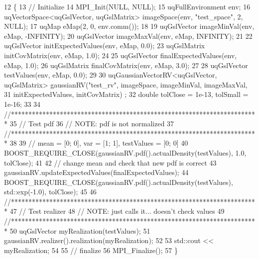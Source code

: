 \begin{DoxyCode}
12 \{
13   \textcolor{comment}{// Initialize}
14   MPI\_Init(NULL, NULL);
15   uqFullEnvironment env;
16   uqVectorSpace<uqGslVector, uqGslMatrix> imageSpace(env, \textcolor{stringliteral}{"test\_space"}, 2, NULL);
17   uqMap eMap(2, 0, env.comm());
18 
19   uqGslVector imageMinVal(env, eMap, -INFINITY);
20   uqGslVector imageMaxVal(env, eMap,  INFINITY);
21 
22   uqGslVector initExpectedValues(env, eMap, 0.0);
23   uqGslMatrix initCovMatrix(env, eMap, 1.0); 
24 
25   uqGslVector finalExpectedValues(env, eMap, 1.0);
26   uqGslMatrix finalCovMatrix(env, eMap, 3.0);
27 
28   uqGslVector testValues(env, eMap, 0.0);
29 
30   uqGaussianVectorRV<uqGslVector, uqGslMatrix> gaussianRV(\textcolor{stringliteral}{"test\_rv"}, imageSpace, imageMinVal, imageMaxVal,
31                                                                          initExpectedValues, initCovMatrix)
      ;
32   \textcolor{keywordtype}{double} tolClose = 1e-13, tolSmall = 1e-16;
33   
34   \textcolor{comment}{//***********************************************************************}
35   \textcolor{comment}{// Test pdf}
36   \textcolor{comment}{// NOTE: pdf is not normalized}
37   \textcolor{comment}{//***********************************************************************}
38 
39   \textcolor{comment}{// mean = [0; 0], var = [1; 1], testValues = [0; 0]}
40   BOOST\_REQUIRE\_CLOSE(gaussianRV.pdf().actualDensity(testValues), 1.0, tolClose);
41 
42   \textcolor{comment}{// change mean and check that new pdf is correct}
43   gaussianRV.updateExpectedValues(finalExpectedValues);
44   BOOST\_REQUIRE\_CLOSE(gaussianRV.pdf().actualDensity(testValues), std::exp(-1.0), tolClose);
45 
46   \textcolor{comment}{//***********************************************************************}
47   \textcolor{comment}{// Test realizer}
48   \textcolor{comment}{// NOTE: just calls it... doesn't check values}
49   \textcolor{comment}{//***********************************************************************}
50   uqGslVector myRealization(testValues);
51   gaussianRV.realizer().realization(myRealization);
52 
53   std::cout << myRealization;
54 
55   \textcolor{comment}{// finalize}
56   MPI\_Finalize();
57 \}
\end{DoxyCode}
